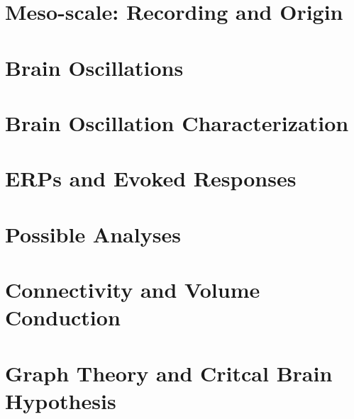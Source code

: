 \documentclass[12pt]{article}
\begin{document}
\section{Meso-scale: Recording and Origin}
\graphicspath{ {./images/9/} }

\newpage

\section{Brain Oscillations}
\graphicspath{ {./images/10/} }

\newpage

\section{Brain Oscillation Characterization}
\graphicspath{ {./images/11/} }

\newpage

\section{ERPs and Evoked Responses}
\graphicspath{ {./images/12/} }

\newpage

\section{Possible Analyses}
\graphicspath{ {./images/13/} }

\newpage

\section{Connectivity and Volume Conduction}
\graphicspath{ {./images/14/} }

\newpage

\section{Graph Theory and Critcal Brain Hypothesis}
\graphicspath{ {./images/15/} }

\newpage
\end{document}
